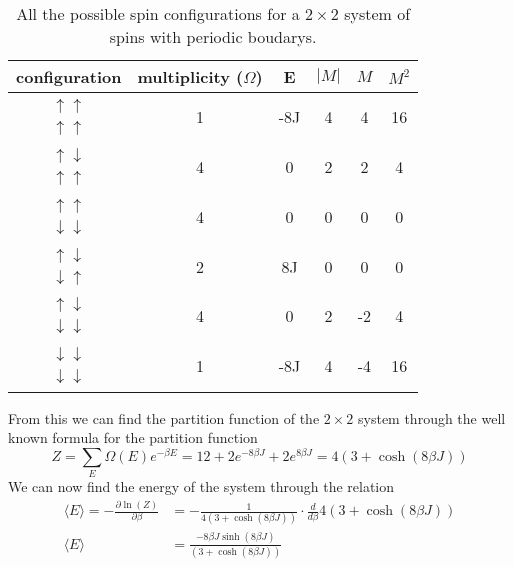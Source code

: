 \documentclass[a4paper,english, 10pt, twoside]{article}
\begin{document}
\begin{table}[H]
\centering
\begin{tabular}{|c|c|c|c|c|c|}
\hline
configuration & multiplicity ($\Omega$)& E & $|M|$ & $M$ & $M^2$\\
\hline
$\begin{matrix}\uparrow \uparrow\\ \uparrow \uparrow\end{matrix}$ & 1 & -8J & 4 & 4 & 16 \\
\hline
$\begin{matrix}\uparrow \downarrow \\ \uparrow \uparrow\end{matrix}$& 4 & 0 & 2 & 2 & 4\\
\hline
$\begin{matrix}\uparrow \uparrow \\ \downarrow \downarrow \end{matrix}$ & 4 & 0 & 0 & 0 & 0 \\
\hline
$\begin{matrix}\uparrow \downarrow  \\ \downarrow \uparrow \end{matrix}$ & 2 & 8J & 0 & 0 & 0 \\
\hline
$\begin{matrix}\uparrow \downarrow \\ \downarrow \downarrow \end{matrix}$ & 4 & 0 & 2  & -2 & 4\\
\hline
$\begin{matrix}\downarrow \downarrow  \\ \downarrow \downarrow \end{matrix}$ & 1& -8J & 4 & -4 & 16 \\

\hline
\end{tabular}
\caption{All the possible spin configurations for a $2\times 2$ system of spins with periodic boudarys.}
\label{table1}
\end{table}
From this we can find the partition function of the $2\times2$ system through the well known formula for the partition function
$$
Z = \sum\limits_E \Omega(E)e^{-\beta E} = 12 + 2e^{-8\beta J} + 2e^{8\beta J} = 4\left(3+\cosh(8\beta J)\right)
$$
We can now find the energy of the system through the relation 
\begin{align*}
 \langle E\rangle = -\frac{\partial \ln\left(Z\right)}{\partial \beta} &= -\frac{1}{4\left(3+\cosh(8\beta J)\right)}\cdot \frac{d}{d\beta}4\left(3+\cosh(8\beta J)\right)\\
 \langle E\rangle &= \frac{-8\beta J \sinh(8\beta J)}{\left(3+\cosh(8\beta J)\right)}
\end{align*}
\end{document}
